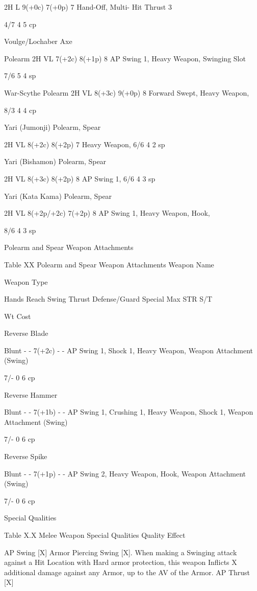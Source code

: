 \documentclass[oneside,11pt,english]{book}
\begin{document}
2H L 9(+0c) 7(+0p) 7 Hand-Off, Multi-
Hit Thrust 3 

4/7 4 5 cp 

Voulge/Lochaber 
Axe 

Polearm 2H VL 7(+2c) 8(+1p) 8 AP Swing 1, 
Heavy Weapon, 
Swinging Slot 

7/6 5 4 sp 

War-Scythe Polearm 2H VL 8(+3c) 9(+0p) 8 Forward Swept, 
Heavy Weapon, 

8/3 4 4 cp 

Yari (Jumonji) Polearm, 
Spear 

2H VL 8(+2c) 8(+2p) 7 Heavy Weapon, 6/6 4 2 sp 

Yari (Bishamon) Polearm, 
Spear 

2H VL 8(+3c) 8(+2p) 8 AP Swing 1, 6/6 4 3 sp 

Yari (Kata Kama) Polearm, 
Spear 

2H VL 8(+2p/+2c) 7(+2p) 8 AP Swing 1, 
Heavy Weapon, 
Hook, 

8/6 4 3 sp 

 
Polearm and Spear Weapon Attachments 

 
Table XX Polearm and Spear Weapon Attachments 
Weapon 
Name 

Weapon 
Type 

Hands Reach Swing Thrust Defense/Guard Special Max 
STR 
S/T 

Wt Cost 

Reverse 
Blade 

Blunt - - 7(+2c) - - AP Swing 1, Shock 1, Heavy 
Weapon, Weapon Attachment 
(Swing) 

7/- 0 6 cp 

Reverse 
Hammer 

Blunt - - 7(+1b) - - AP Swing 1, Crushing 1, 
Heavy Weapon, Shock 1, 
Weapon Attachment (Swing) 

7/- 0 6 cp 

Reverse 
Spike 

Blunt - - 7(+1p) - - AP Swing 2, Heavy Weapon, 
Hook, Weapon Attachment 
(Swing) 

7/- 0 6 cp 

 

Special Qualities 

 
Table X.X Melee Weapon Special Qualities 
Quality Effect 


AP Swing [X] Armor Piercing Swing [X]. When making a Swinging attack against a Hit Location with Hard 
armor protection, this weapon Inflicts X additional damage against any Armor, up to the AV of the 
Armor. 
AP Thrust 
[X] 
\end{document}

